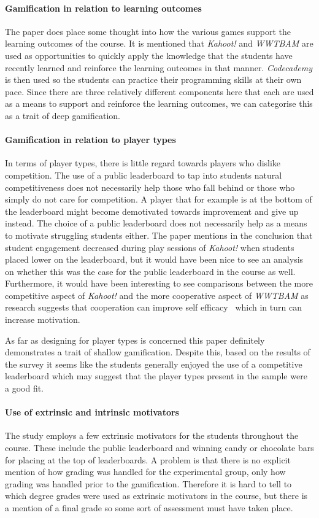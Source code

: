 \paragraph{Gamification in relation to learning outcomes}
The paper does place some thought into how the various games support the learning outcomes of the course. It is mentioned that \emph{Kahoot!} and \emph{WWTBAM} are used as opportunities to quickly apply the knowledge that the students have recently learned and reinforce the learning outcomes in that manner. \emph{Codecademy} is then used so the students can practice their programming skills at their own pace. Since there are three relatively different components here that each are used as a means to support and reinforce the learning outcomes, we can categorise this as a trait of deep gamification.  

\paragraph{Gamification in relation to player types}
In terms of player types, there is little regard towards players who dislike competition. The use of a public leaderboard to tap into students natural competitiveness does not necessarily help those who fall behind or those who simply do not care for competition. A player that for example is at the bottom of the leaderboard might become demotivated towards improvement and give up instead. The choice of a public leaderboard does not necessarily help as a means to motivate struggling students either. The paper mentions in the conclusion that student engagement decreased during play sessions of \emph{Kahoot!} when students placed lower on the leaderboard, but it would have been nice to see an analysis on whether this was the case for the public leaderboard in the course as well. Furthermore, it would have been interesting to see comparisons between the more competitive aspect of \emph{Kahoot!} and the more cooperative aspect of \emph{WWTBAM} as research suggests that cooperation can improve self efficacy~\cite{staiano2013adolescent} which in turn can increase motivation. 

As far as designing for player types is concerned this paper definitely demonstrates a trait of shallow gamification. 
Despite this, based on the results of the survey it seems like the students generally enjoyed the use of a competitive leaderboard which may suggest that the player types present in the sample were a good fit. 

\paragraph{Use of extrinsic and intrinsic motivators}
The study employs a few extrinsic motivators for the students throughout the course. These include the public leaderboard and winning candy or chocolate bars for placing at the top of leaderboards. A problem is that there is no explicit mention of how grading was handled for the experimental group, only how grading was handled prior to the gamification. Therefore it is hard to tell to which degree grades were used as extrinsic motivators in the course, but there is a mention of a final grade so some sort of assessment must have taken place. 

